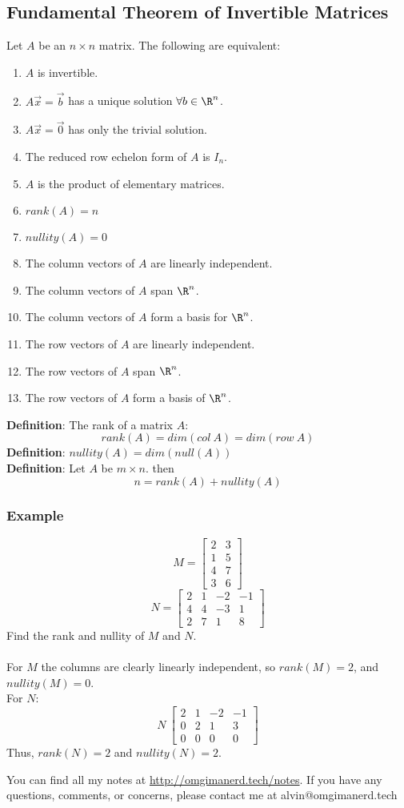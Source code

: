 \documentclass{math}
\begin{document}
\subsection*{Fundamental Theorem of Invertible Matrices}
Let \( A \) be an \( n\times n \) matrix. The following are equivalent:
\begin{enumerate}
  \item \( A \) is invertible.
  \item \( A\vec{x} = \vec{b} \) has a unique solution \( \forall{b}\in\R^n \).
  \item \( A\vec{x} = \vec{0} \) has only the trivial solution.
  \item The reduced row echelon form of \( A \) is \( I_n \).
  \item \( A \) is the product of elementary matrices.
  \item \( rank(A) = n \)
  \item \( nullity(A) = 0 \)
  \item The column vectors of \( A \) are linearly independent.
  \item The column vectors of \( A \) span \( \R^n \).
  \item The column vectors of \( A \) form a basis for \( \R^n \).
  \item The row vectors of \( A \) are linearly independent.
  \item The row vectors of \( A \) span \( \R^n \).
  \item The row vectors of \( A \) form a basis of \( \R^n \).
\end{enumerate}
\textbf{Definition}: The rank of a matrix \( A \):
\[ rank(A) = dim(col~A) = dim(row~A) \]
\textbf{Definition}: \( nullity(A) = dim(null(A)) \) \\
\textbf{Definition}: Let \( A \) be \( m\times n \). then
\[ n = rank(A)+nullity(A) \]

\subsubsection*{Example}
\[ M = \begin{bmatrix}2 & 3 \\ 1 & 5 \\ 4 & 7 \\ 3 & 6\end{bmatrix} \]
\[ N = \begin{bmatrix}2 & 1 & -2 & -1 \\ 4 & 4 & -3 & 1 \\ 2 & 7 & 1 &
  8\end{bmatrix} \]
Find the rank and nullity of \( M \) and \( N \). \\ \\
For \( M \) the columns are clearly linearly independent, so \( rank(M) = 2 \),
and \( nullity(M) = 0 \). \\
For \( N \):
\[ N~\begin{bmatrix}2 & 1 & -2 & -1 \\ 0 & 2 & 1 & 3 \\ 0 & 0 & 0 &
  0\end{bmatrix} \]
Thus, \( rank(N) = 2 \) and \( nullity(N) = 2 \).

\begin{center}
  You can find all my notes at \url{http://omgimanerd.tech/notes}. If you have
  any questions, comments, or concerns, please contact me at
  alvin@omgimanerd.tech
\end{center}
\end{document}
